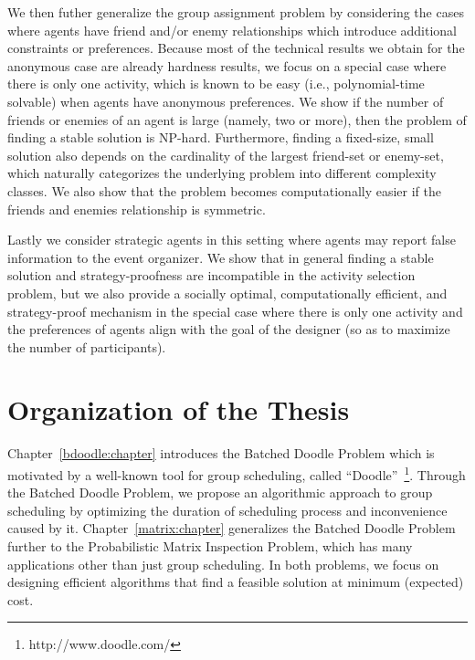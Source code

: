 We then futher generalize the group assignment problem by considering the cases where agents have friend and/or enemy relationships which introduce additional constraints or preferences. Because most of the technical results we obtain for the anonymous case are already hardness results, we focus on a special case where there is only one activity, which is known to be easy (i.e., polynomial-time solvable) when agents have anonymous preferences. We show if the number of friends or enemies of an agent is large (namely, two or more), then the problem of finding a stable solution is NP-hard. Furthermore, finding a fixed-size, small solution also depends on the cardinality of the largest friend-set or enemy-set, which naturally categorizes the underlying problem into different complexity classes. We also show that the problem becomes computationally easier if the friends and enemies relationship is symmetric.

Lastly we consider strategic agents in this setting where agents may report false information to the event organizer. We show that in general finding a stable solution and strategy-proofness are incompatible in the activity selection problem, but we also provide a socially optimal, computationally efficient, and strategy-proof mechanism in the special case where there is only one activity and the preferences of agents align with the goal of the designer (so as to maximize the number of participants).


\section{Organization of the Thesis}
Chapter~\ref{bdoodle:chapter} introduces the Batched Doodle Problem which is motivated by a well-known tool for group scheduling, called ``Doodle''~\footnote{http://www.doodle.com/}. Through the Batched Doodle Problem, we propose an algorithmic approach to group scheduling by optimizing the duration of scheduling process and inconvenience caused by it. Chapter~\ref{matrix:chapter} generalizes the Batched Doodle Problem further to the Probabilistic Matrix Inspection Problem, which has many applications other than just group scheduling. In both problems, we focus on designing efficient algorithms that find a feasible solution at minimum (expected) cost. 


